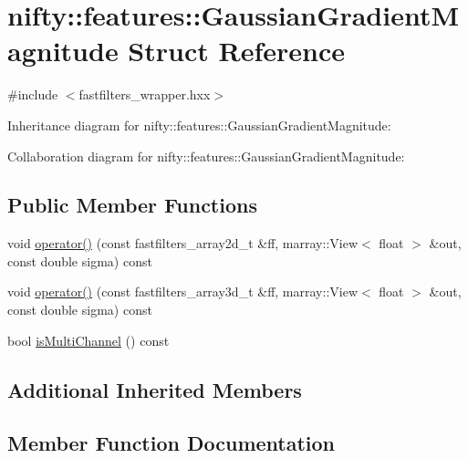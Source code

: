 \hypertarget{structnifty_1_1features_1_1GaussianGradientMagnitude}{}\section{nifty\+:\+:features\+:\+:Gaussian\+Gradient\+Magnitude Struct Reference}
\label{structnifty_1_1features_1_1GaussianGradientMagnitude}


{\ttfamily \#include $<$fastfilters\+\_\+wrapper.\+hxx$>$}



Inheritance diagram for nifty\+:\+:features\+:\+:Gaussian\+Gradient\+Magnitude\+:


Collaboration diagram for nifty\+:\+:features\+:\+:Gaussian\+Gradient\+Magnitude\+:
\subsection*{Public Member Functions}
\begin{DoxyCompactItemize}
\item 
void \hyperlink{structnifty_1_1features_1_1GaussianGradientMagnitude_a27ef99659834c0340d07e0012874d38c}{operator()} (const fastfilters\+\_\+array2d\+\_\+t \&ff, marray\+::\+View$<$ float $>$ \&out, const double sigma) const 
\item 
void \hyperlink{structnifty_1_1features_1_1GaussianGradientMagnitude_a6990d7d773aa0223aceed88460d270db}{operator()} (const fastfilters\+\_\+array3d\+\_\+t \&ff, marray\+::\+View$<$ float $>$ \&out, const double sigma) const 
\item 
bool \hyperlink{structnifty_1_1features_1_1GaussianGradientMagnitude_a38cb11a99efb83ffa19eda0b74d02456}{is\+Multi\+Channel} () const 
\end{DoxyCompactItemize}
\subsection*{Additional Inherited Members}


\subsection{Member Function Documentation}
\hypertarget{structnifty_1_1features_1_1GaussianGradientMagnitude_a38cb11a99efb83ffa19eda0b74d02456}{}
